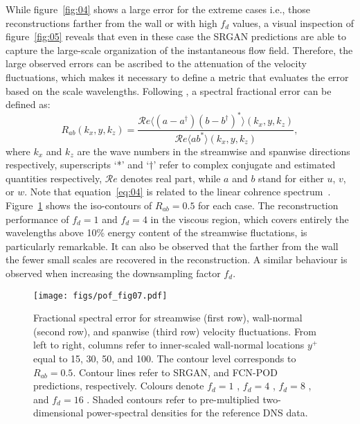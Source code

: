While figure~\ref{fig:04} shows a large error for the extreme cases i.e., those reconstructions farther from the wall or with high $f_d$ values, a visual inspection of figure~\ref{fig:05} reveals that even in these case the SRGAN predictions are able to capture the large-scale organization of the instantaneous flow field.
Therefore, the large observed errors can be ascribed to the attenuation of the velocity fluctuations, which makes it necessary to define a metric that evaluates the error based on the scale wavelengths.
Following \citet{encinar2019logarithmic}, a spectral fractional error can be defined as:
\begin{equation}
    R_{ab}(k_x,y,k_z) = \frac{\mathcal{R}e\langle(a-a^{\dagger})(b-b^{\dagger})^*\rangle(k_x,y,k_z)}{\mathcal{R}e\langle ab^*\rangle(k_x,y,k_z)},
    \label{eq:04}
\end{equation}
\noindent where $k_x$ and $k_z$ are the wave numbers in the streamwise and spanwise directions respectively, superscripts `*' and `$\dagger$' refer to complex conjugate and estimated quantities respectively, $\mathcal{R}e$ denotes real part, while $a$ and $b$ stand for either $u$, $v$, or $w$.
Note that equation~\ref{eq:04} is related to the linear cohrence spectrum~\citep{baars2016spectral,encinar2019logarithmic,tanarro2020effect}.
Figure~\ref{fig:07} shows the iso-contours of $R_{ab}=0.5$ for each case.
The reconstruction performance of $f_d=1$ and $f_d=4$ in the viscous region, which covers entirely the wavelengths above 10\% energy content of the streamwise fluctations, is particularly remarkable.
It can also be observed that the farther from the wall the fewer small scales are recovered in the reconstruction.
A similar behaviour is observed when increasing the downsampling factor $f_d$.
\begin{figure}[!t]
  \centerline{\texttt{[image: figs/pof\_fig07.pdf]}}
  \caption{Fractional spectral error for streamwise (first row), wall-normal (second row), and spanwise (third row) velocity fluctuations. From left to right, columns refer to inner-scaled wall-normal locations $y^+$ equal to 15, 30, 50, and 100. The contour level corresponds to $R_{ab}=0.5$. Contour lines refer to  SRGAN, and  FCN-POD predictions, respectively. Colours denote $f_d=1$ , $f_d=4$ , $f_d=8$ , and $f_d=16$ . Shaded contours refer to pre-multiplied two-dimensional power-spectral densities for the reference DNS data.}
\label{fig:07}
\end{figure}

